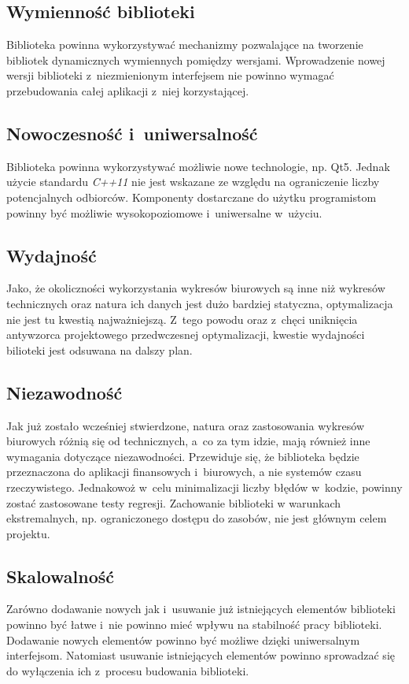 \subsection{Wymienność biblioteki}
Biblioteka powinna wykorzystywać mechanizmy pozwalające na tworzenie bibliotek dynamicznych wymiennych pomiędzy wersjami. Wprowadzenie nowej wersji biblioteki z~niezmienionym interfejsem nie powinno wymagać przebudowania całej aplikacji z~niej korzystającej.

\subsection{Nowoczesność i~uniwersalność}
Biblioteka powinna wykorzystywać możliwie nowe technologie, np. Qt5. Jednak użycie standardu \textit{C++11} nie jest wskazane ze względu na ograniczenie liczby potencjalnych odbiorców. Komponenty dostarczane do użytku programistom powinny być możliwie wysokopoziomowe i~uniwersalne w~użyciu.

\subsection{Wydajność}
Jako, że okoliczności wykorzystania wykresów biurowych są inne niż wykresów technicznych oraz natura ich danych jest dużo bardziej statyczna, optymalizacja nie jest tu kwestią najważniejszą. 
Z~tego powodu oraz z~chęci uniknięcia antywzorca projektowego przedwczesnej optymalizacji, kwestie wydajności bilioteki jest odsuwana na dalszy plan.

\subsection{Niezawodność}
Jak już zostało wcześniej stwierdzone, natura oraz zastosowania wykresów biurowych różnią się od technicznych, a~co za tym idzie, mają również inne wymagania dotyczące niezawodności. Przewiduje się, że biblioteka będzie przeznaczona do aplikacji finansowych i~biurowych, a nie systemów czasu rzeczywistego. Jednakowoż w~celu minimalizacji liczby błędów w~kodzie, powinny zostać zastosowane testy regresji. Zachowanie biblioteki w warunkach ekstremalnych, np. ograniczonego dostępu do zasobów, nie jest głównym celem projektu.


\subsection{Skalowalność}
Zarówno dodawanie nowych jak i~usuwanie już istniejących elementów biblioteki powinno być łatwe i~nie powinno mieć wpływu na stabilność pracy biblioteki. Dodawanie nowych elementów powinno być możliwe dzięki uniwersalnym interfejsom. Natomiast usuwanie istniejących elementów powinno sprowadzać się do wyłączenia ich z~procesu budowania biblioteki.
